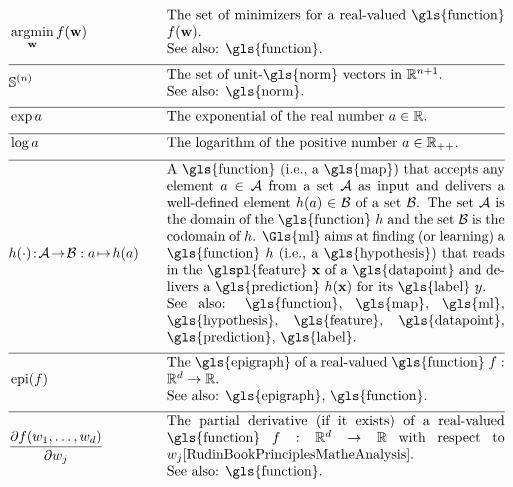 \newpage
\begin{align}
    &\argmin_{\weights} f(\weights) &\quad &\parbox{.70\textwidth}{The set of minimizers for a real-valued \gls{function} $f(\weights)$. 
    	\\ See also: \gls{function}. } \nonumber \\[2mm] \hline \nonumber\\[-5mm]
    &\sphere{\nrnodes} &\quad &\parbox{.70\textwidth}{The set of unit-\gls{norm} vectors in $\mathbb{R}^{\nrnodes+1}$.
    	\\ See also: \gls{norm}. }\nonumber \\[2mm] \hline \nonumber\\[-5mm]
	&\exp a &\quad &\mbox{The exponential of the real number $a \in \mathbb{R}$.  } \nonumber \\[2mm] \hline \nonumber\\[-5mm]
	 &\log a &\quad &\mbox{The logarithm of the positive number $a \in \mathbb{R}_{++}$.  } \nonumber \\[2mm] \hline \nonumber\\[-5mm]
	 &\hypothesis(\cdot)\!:\!\mathcal{A}\!\rightarrow\!\mathcal{B} :  a \!\mapsto\!h(a) &\quad &\parbox{.70\textwidth}{
	 	A \gls{function} (i.e., a \gls{map}) that accepts any element $a \in \mathcal{A}$ from a set $\mathcal{A}$ 
	 	as input and delivers a well-defined element $\hypothesis(a) \in \mathcal{B}$ of a set $\mathcal{B}$. 
	 	The set $\mathcal{A}$ is the domain of the \gls{function} $\hypothesis$ and the set $\mathcal{B}$ is the 
	 	codomain of $\hypothesis$. \Gls{ml} aims at finding (or learning) a \gls{function} $\hypothesis$ (i.e., a \gls{hypothesis}) 
	 	that reads in the \glspl{feature} $\featurevec$ of a \gls{datapoint} and delivers a \gls{prediction} $\hypothesis(\featurevec)$
	 	for its \gls{label} $\truelabel$.
		\\ See also: \gls{function}, \gls{map}, \gls{ml}, \gls{hypothesis}, \gls{feature}, \gls{datapoint}, \gls{prediction}, \gls{label}.} \nonumber \\[2mm] \hline \nonumber\\[-5mm]
	 &\operatorname{epi}(f)  & \quad & \parbox{.70\textwidth}{The \gls{epigraph} of a real-valued \gls{function} 
	 	$f: \mathbb{R}^{\featuredim}\rightarrow \mathbb{R}$.
		\\ See also: \gls{epigraph}, \gls{function}. } \nonumber \\[2mm]  \hline \nonumber\\[-5mm]
	 &  \frac{\partial f(\weight_{1},\ldots,\weight_{\nrfeatures})}{\partial \weight_{\featureidx}} & \quad & \parbox{.70\textwidth}{The partial derivative (if it exists) of 
	 		a real-valued \gls{function} $f: \mathbb{R}^{\featuredim}\rightarrow \mathbb{R}$ with respect to\ $\weight_{\featureidx}$\cite[Ch. 9]{RudinBookPrinciplesMatheAnalysis}.
			\\ See also: \gls{function}.
			} \nonumber 
\end{align} 

